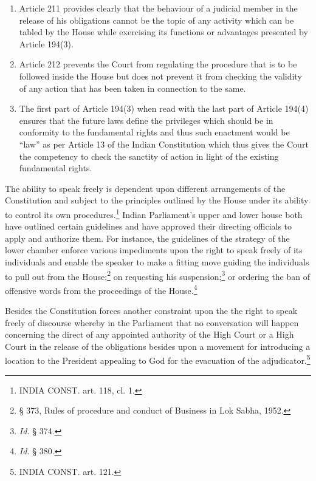 \begin{multicols}{2}
\begin{enumerate}[label=$\bullet$]
\item Article 211 provides clearly that the behaviour of a judicial member in the release of
his obligations cannot be the topic of any activity which can be tabled by the House
while exercising its functions or advantages presented by Article 194(3).

\item Article 212 prevents the Court from regulating the procedure that is to be followed
inside the House but does not prevent it from checking the validity of any action that
has been taken in connection to the same.

\item The first part of Article 194(3) when read with the last part of Article 194(4) ensures
that the future laws define the privileges which should be in conformity to the
fundamental rights and thus such enactment would be “law” as per Article 13 of the
Indian Constitution which thus gives the Court the competency to check the sanctity
of action in light of the existing fundamental rights.
\end{enumerate}


\newpage


\noi
The ability to speak freely is dependent upon different arrangements of the Constitution and
subject to the principles outlined by the House under its ability to control its own
procedures.\footnote{INDIA CONST. art. 118, cl. 1.} Indian Parliament’s upper and lower house both have outlined certain
guidelines and have approved their directing officials to apply and authorize them. For
instance, the guidelines of the strategy of the lower chamber enforce various impediments
upon the right to speak freely of its individuals and enable the speaker to make a fitting move
guiding the individuals to pull out from the House;\footnote{§ 373, Rules of procedure and conduct of Business in Lok Sabha, 1952.} on requesting his suspension;\footnote{\textit{Id.} § 374.} or ordering the ban of offensive words from the proceedings of the House.\footnote{\textit{Id.} § 380.}

\noi
Besides the Constitution forces another constraint upon the the right to speak freely of
discourse whereby in the Parliament that no conversation will happen concerning the direct
of any appointed authority of the High Court or a High Court in the release of the obligations
besides upon a movement for introducing a location to the President appealing to God for the
evacuation of the adjudicator.\footnote{INDIA CONST. art. 121.}


\end{multicols}
